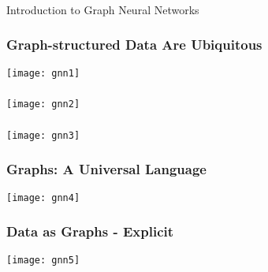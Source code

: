 \begin{frame}[fragile]\frametitle{}
\begin{center}
{\Large Introduction to Graph Neural Networks}
\end{center}
\end{frame}


\begin{frame}[fragile]\frametitle{ Graph-structured Data Are Ubiquitous }

\begin{center}
\texttt{[image: gnn1]}
\end{center}	  

\end{frame}

\begin{frame}[fragile]\frametitle{}

\begin{center}
\texttt{[image: gnn2]}
\end{center}	  

\end{frame}

\begin{frame}[fragile]\frametitle{}

\begin{center}
\texttt{[image: gnn3]}
\end{center}	  

\end{frame}

\begin{frame}[fragile]\frametitle{Graphs: A Universal Language }

\begin{center}
\texttt{[image: gnn4]}
\end{center}	  

\end{frame}


\begin{frame}[fragile]\frametitle{Data as Graphs - Explicit }

\begin{center}
\texttt{[image: gnn5]}
\end{center}	  

\end{frame}

